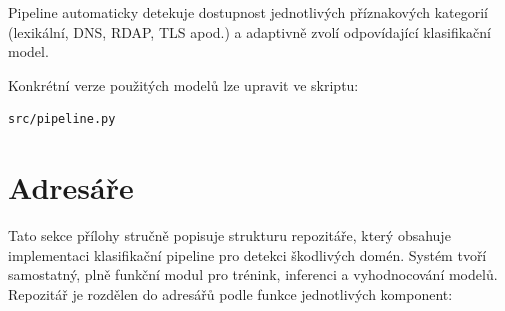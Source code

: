 Pipeline automaticky detekuje dostupnost jednotlivých příznakových kategorií (lexikální, DNS, RDAP, TLS apod.) a adaptivně zvolí odpovídající klasifikační model.

Konkrétní verze použitých modelů lze upravit ve skriptu:

\begin{verbatim}
src/pipeline.py
\end{verbatim}

\section*{Adresáře}
\label{sec:adresare}

Tato sekce přílohy stručně popisuje strukturu repozitáře, který obsahuje implementaci klasifikační pipeline pro detekci škodlivých domén. Systém tvoří samostatný, plně funkční modul pro trénink, inferenci a vyhodnocování modelů. Repozitář je rozdělen do adresářů podle funkce jednotlivých komponent:

